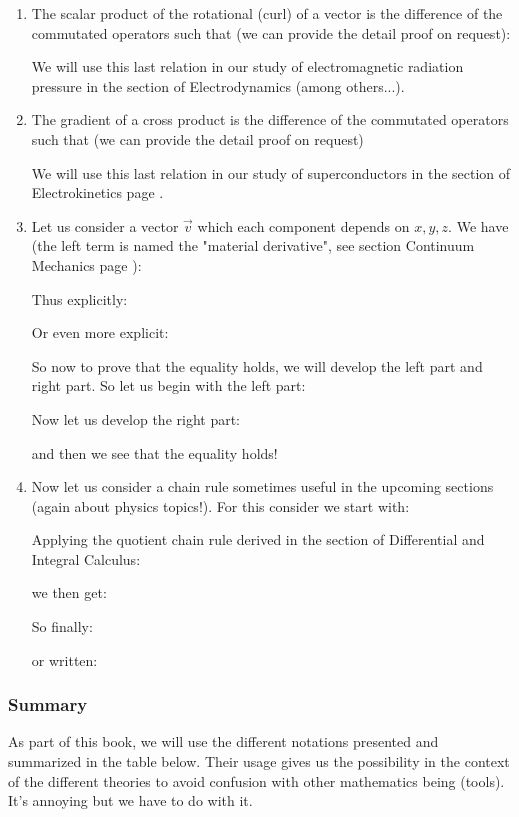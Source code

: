 \begin{enumerate}
		
		\item The scalar product of the rotational (curl) of a vector is the difference of the commutated operators such that (we can provide the detail proof on request):
		
		We will use this last relation in our study of electromagnetic radiation pressure in the section of Electrodynamics (among others...).
		
		\item The gradient of a cross product is the difference of the commutated operators such that (we can provide the detail proof on request)
		
		We will use this last relation in our study of superconductors in the section of Electrokinetics page \pageref{superconductivity}.
		
		\item Let us consider a vector $\vec{v}$ which each component depends on $x,y,z$. We have (the left term is named the "material derivative", see section Continuum Mechanics page \pageref{material derivative}):
		
		Thus explicitly:
		
		Or even more explicit:
		
		So now to prove that the equality holds, we will develop the left part and right part. So let us begin with the left part:
		
		Now let us develop the right part:
		
		and then we see that the equality holds!
		
		\item Now let us consider a chain rule sometimes useful in the upcoming sections (again about physics topics\label{curl quotient chain rule}!). For this consider we start with:
		
		Applying the quotient chain rule derived in the section of Differential and Integral Calculus:
		
		 we then get:
		
		So finally:
		
		or written:
		
	\end{enumerate}
	
	\pagebreak
	\subsubsection{Summary}
	As part of this book, we will use the different notations presented and summarized in the table below. Their usage gives us the possibility in the context of the different theories to avoid confusion with other mathematics being (tools). It's annoying but we have to do with it.
	
